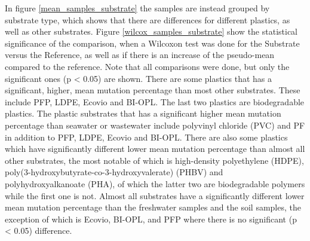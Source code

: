 In figure \ref{mean_samples_substrate} the samples are instead grouped by substrate type, which shows that there are differences for different plastics, as well as other substrates.
Figure \ref{wilcox_samples_substrate} show the statistical significance of the comparison, when a Wilcoxon test was done for the Substrate versus the Reference, as well as if there is an increase of the pseudo-mean compared to the reference.
Note that all comparisons were done, but only the significant ones (p < 0.05) are shown.
There are some plastics that has a significant, higher, mean mutation percentage than most other substrates. These include PFP, LDPE, Ecovio and BI-OPL. The last two plastics are biodegradable plastics.
The plastic substrates that has a significant higher mean mutation percentage than seawater or wastewater include polyvinyl chloride (PVC) and PF in addition to PFP, LDPE, Ecovio and BI-OPL.
There are also some plastics which have significantly different lower mean mutation percentage than almost all other substrates, the most notable of which is high-density polyethylene (HDPE), poly(3-hydroxybutyrate-co-3-hydroxyvalerate) (PHBV) and polyhydroxyalkanoate (PHA), of which the latter two are biodegradable polymers while the first one is not.
Almost all substrates have a significantly different lower mean mutation percentage than the freshwater samples and the soil samples, the exception of which is Ecovio, BI-OPL, and PFP where there is no significant (p < 0.05) difference. 


